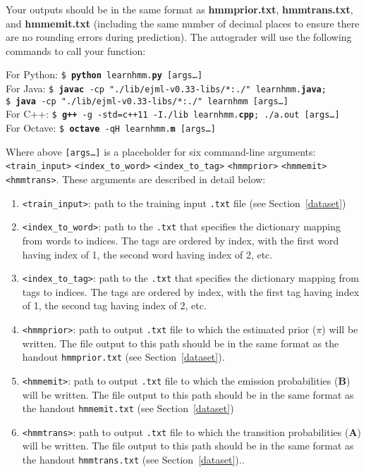 \documentclass[11pt,addpoints,answers]{exam}
\numberwithin{equation}{section} %
\numberwithin{figure}{section} %
\numberwithin{table}{section} %
\begin{document}
Your outputs should be in the same format as \textbf{hmmprior.txt}, \textbf{hmmtrans.txt}, and \textbf{hmmemit.txt} (including the same number of decimal places to ensure there are no rounding errors during prediction). The autograder will use the following commands to call your function:

\begin{tabbing}
For Python: \=\texttt{\$ \textbf{python} learnhmm.\textbf{py} [args\dots]}\\
For Java: \>\texttt{\$ \textbf{javac} -cp "./lib/ejml-v0.33-libs/*:./" learnhmm.\textbf{java};}\\
          \>  \texttt{\$ \textbf{java} -cp "./lib/ejml-v0.33-libs/*:./" learnhmm [args\dots]}\\
For C++: \>\texttt{\$ \textbf{g++} -g -std=c++11 -I./lib learnhmm.\textbf{cpp}; ./a.out [args\dots]}\\
For Octave: \>\texttt{\$ \textbf{octave} -qH learnhmm.\textbf{m} [args\dots]}
\end{tabbing}

Where above \texttt{[args\dots]} is a placeholder for six command-line arguments:\texttt{<train\_input>} \texttt{<index\_to\_word>} \texttt{<index\_to\_tag>} \texttt{<hmmprior>} \texttt{<hmmemit>} \texttt{<hmmtrans>}. These arguments are described in detail below:
\begin{enumerate}
    \item \texttt{<train\_input>}: path to the training input \texttt{.txt} file (see Section~\ref{dataset})
    \item \texttt{<index\_to\_word>}: path to the \texttt{.txt} that specifies the dictionary mapping from words to indices. The tags are ordered by index, with the first word having index of 1, the second word having index of 2, etc.
    \item \texttt{<index\_to\_tag>}: path to the \texttt{.txt} that specifies the dictionary mapping from tags to indices. The tags are ordered by index, with the first tag having index of 1, the second tag having index of 2, etc.
    \item \texttt{<hmmprior>}: path to output \texttt{.txt} file to which the estimated prior (\boldmath${\pi}$) will be written. The file output to this path should be in the same format as the handout \texttt{hmmprior.txt} (see Section~\ref{dataset}).
    \item \texttt{<hmmemit>}: path to output \texttt{.txt} file to which the emission probabilities ($\mathbf B$) will be written. The file output to this path should be in the same format as the handout \texttt{hmmemit.txt} (see Section~\ref{dataset})
    \item \texttt{<hmmtrans>}: path to output \texttt{.txt} file to which the transition probabilities ($\mathbf A$) will be written. The file output to this path should be in the same format as the handout \texttt{hmmtrans.txt} (see Section~\ref{dataset})..
\end{enumerate}
\end{document}
